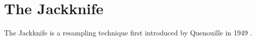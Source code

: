 \section{The Jackknife}

  The Jackknife is a resampling technique first introduced by Quenouille in 1949 \cite{1949quenouille}. 
